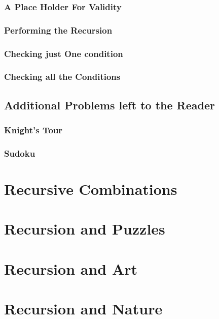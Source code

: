 \documentclass[10pt,a4paper]{book}
\begin{document}
\subsubsection{A Place Holder For Validity}

\subsubsection{Performing the Recursion}

\subsubsection{Checking just One condition}


\subsubsection{Checking all the Conditions}




\subsection{Additional Problems left to the Reader}

\subsubsection{Knight's Tour}

\subsubsection{Sudoku}




\section{Recursive Combinations}



\section{Recursion and Puzzles}



\section{Recursion and Art}

\section{Recursion and Nature}
\end{document}
